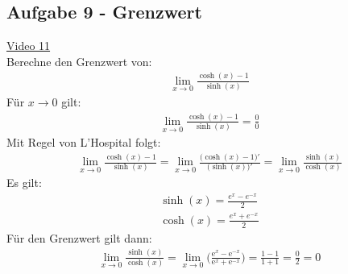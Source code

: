\subsection{Aufgabe 9 - Grenzwert}
\href{https://youtu.be/z0jsH4rjKZM}{Video 11}\\
Berechne den Grenzwert von:\\
\begin{align*}
\lim\limits_ {x\to 0}\frac{\cosh(x)-1}{\sinh(x)}
\end{align*}
Für $ x \to 0 $ gilt:
\begin{align*}
\lim\limits_ {x\to 0}\frac{\cosh(x)-1}{\sinh(x)}=\frac{0}{0}
\end{align*}
Mit Regel von L'Hospital folgt:\\
\begin{align*}
\lim\limits_ {x\to 0}\frac{\cosh(x)-1}{\sinh(x)}=\lim\limits_ {x\to 0}\frac{\big(\cosh(x)-1\big)'}{\big(\sinh(x)\big)'}=\lim\limits_ {x\to 0}\frac{\sinh(x)}{\cosh(x)}
\end{align*}
Es gilt:\\
\begin{align*}
\sinh(x)=\frac{e^x-e^{-x}}{2}\\
\cosh(x)=\frac{e^x+e^{-x}}{2}
\end{align*}
Für den Grenzwert gilt dann:\\
\begin{align*}
\lim\limits_ {x\to 0}\frac{\sinh(x)}{\cosh(x)}=\lim\limits_ {x\to 0}\bigg(\frac{\mathrm{e}^x-\mathrm{e}^{-x}}{\mathrm{e}^x+\mathrm{e}^{-x}}\bigg)=\frac{1-1}{1+1}=\frac{0}{2}=0
\end{align*}
\newpage
\noindent
